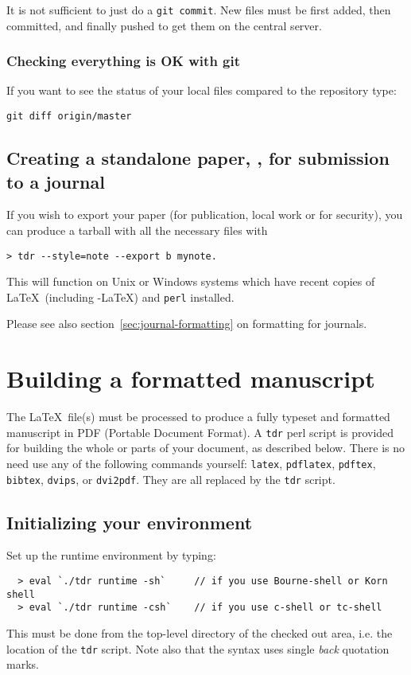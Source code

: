It is not sufficient to just do a \texttt{git commit}. New files must be
first added, then committed, and finally pushed to get them on the central server.


\subsubsection{Checking everything is OK with git}

If you want to see the status of your local files compared to the
repository type:

\texttt{git  diff origin/master }




\subsection{Creating a standalone paper, \eg, for submission to a journal}

If you wish to export your paper (for publication, local work or for security),
you can produce a tarball with all the necessary files with
\vspace*{-2.5ex}\begin{verbatim}
> tdr --style=note --export b mynote.
\end{verbatim}
This will function on  Unix or Windows systems which have
recent copies of \LaTeX\ (including \AmS-\LaTeX) and \texttt{perl} installed.

Please see also section~\ref{sec:journal-formatting} on formatting for journals.


\clearpage
\section{Building a formatted manuscript\label{tdr}}

The \LaTeX\ file(s) must be processed to produce a
fully typeset and formatted manuscript in PDF (Portable Document Format).
A \texttt{tdr} perl script is provided for building the whole or
parts of your document, as described below.
There is no need use any of the following commands yourself:
\texttt{latex},
\texttt{pdflatex},
\texttt{pdftex},
\texttt{bibtex},
\texttt{dvips}, or
\texttt{dvi2pdf}.
They are all replaced by the \texttt{tdr} script.


\subsection{Initializing your environment}
%
Set up the runtime environment by typing:
%
\vspace*{-2.5ex}\begin{verbatim}
  > eval `./tdr runtime -sh`     // if you use Bourne-shell or Korn shell
  > eval `./tdr runtime -csh`    // if you use c-shell or tc-shell
\end{verbatim}
%
This must be done from the top-level directory of the checked out
area, i.e. the location of the \texttt{tdr} script.
Note also that the syntax uses single \emph{back} quotation marks.

